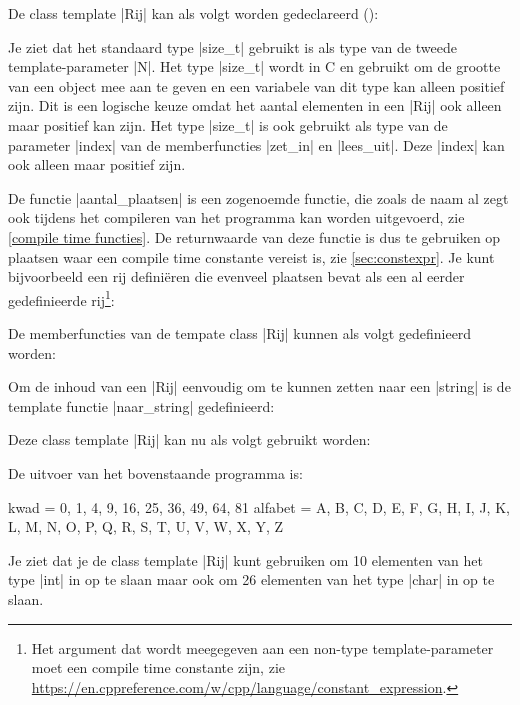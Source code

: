 \begin{cpplstShortInline}
\iftoggle{ebook}{%
	\needspace{2\baselineskip}
}{%
	\needspace{4cm}
}%
De class template |Rij| kan als volgt worden gedeclareerd ():

Je ziet dat het standaard type |size_t| gebruikt is als type van de tweede template\hyp{}parameter |N|.
Het type |size_t| wordt in C en \Cpp{} gebruikt om de grootte van een object mee aan te geven en een variabele van dit type kan alleen positief zijn.
Dit is een logische keuze omdat het aantal elementen in een |Rij| ook alleen maar positief kan zijn.
Het type |size_t| is ook gebruikt als type van de parameter |index| van de memberfuncties |zet_in| en |lees_uit|. Deze |index| kan ook alleen maar positief zijn.

De functie |aantal_plaatsen| is een zogenoemde  functie, die zoals de naam al zegt ook tijdens het compileren van het programma kan worden uitgevoerd, zie \cref{compile time functies}.
De returnwaarde van deze functie is dus te gebruiken op plaatsen waar een compile time constante vereist is, zie \cref{sec:constexpr}.
Je kunt bijvoorbeeld een rij definiëren die evenveel plaatsen bevat als een al eerder gedefinieerde rij\footnote{%
	Het argument dat wordt meegegeven aan een non-type template-parameter moet een compile time constante zijn, zie \url{https://en.cppreference.com/w/cpp/language/constant_expression}.
}:

De memberfuncties van de tempate class |Rij| kunnen als volgt gedefinieerd worden:

Om de inhoud van een |Rij| eenvoudig om te kunnen zetten naar een |string| is de template functie |naar_string| gedefinieerd:

Deze class template |Rij| kan nu als volgt gebruikt worden:

De uitvoer van het bovenstaande programma is:
\begin{cpplstfragment}[language=]
kwad = 0, 1, 4, 9, 16, 25, 36, 49, 64, 81
alfabet = A, B, C, D, E, F, G, H, I, J, K, L, M, N, O, P, Q, R, S, T, U, V, W, X, Y, Z
\end{cpplstfragment}

Je ziet dat je de class template |Rij| kunt gebruiken om 10 elementen van het type |int| in op te slaan maar ook om 26 elementen van het type |char| in op te slaan.


\end{cpplstShortInline}
